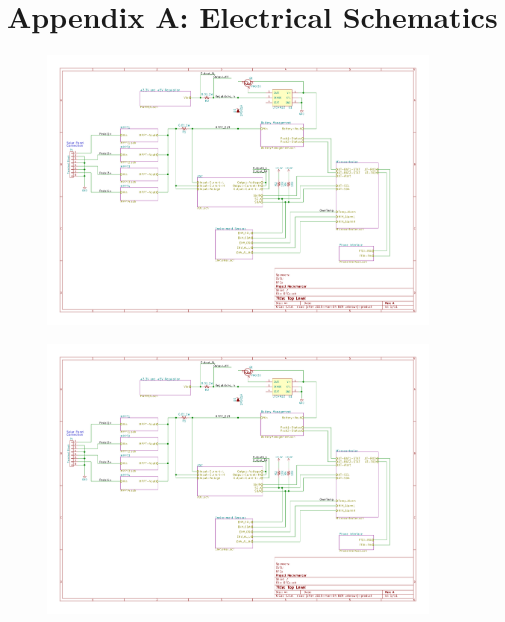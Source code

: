\documentclass{article}
\begin{document}
{\newpage
\section{Appendix A: Electrical Schematics}

\begin{figure}[H]
	\centering
	\includegraphics[page=1,width=0.9\textwidth]{RFCxSchematics.pdf}
	\caption{}
	\label{fig:schemp1}
\end{figure}

\begin{figure}[H]
	\centering
	\includegraphics[page=2,width=0.9\textwidth]{RFCxSchematics.pdf}
	\caption{}
	\label{fig:schemp2}
\end{figure}

}
\end{document}
